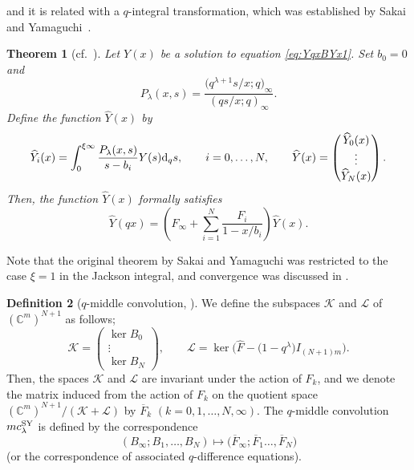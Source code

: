 \documentclass[pdftex]{sigma}
\numberwithin{equation}{section}
\newtheorem{Theorem}{Theorem}[section]
\theoremstyle{definition}
\newtheorem{Definition}[Theorem]{Definition}
\begin{document}
and it is related with a $q$-integral transformation, which was established by Sakai and Yamaguchi~\cite{SY}.
\begin{Theorem}[{cf.~\cite[Theorem 2.1]{SY}}] \label{thm:qcintSY}
Let $Y(x)$ be a solution to equation \eqref{eq:YqxBYx1}.
Set $b_0 =0$ and
\begin{equation}
 P_{\lambda}(x, s) = \frac{\bigl(q^{\lambda +1} s/x;q\bigr)_{\infty }}{(q s/x;q)_{\infty }}.  \label{eq:Plaxss/x}
\end{equation}
Define the function $\widehat{Y}(x) $ by
\begin{equation}
 \widehat{Y}_{i}(x) = \int^{\xi \infty}_{0}\frac{P_{\lambda}(x, s)}{s-b_{i}}Y(s) {\rm d}_{q}s,\qquad i=0,\dots ,N, \qquad \widehat{Y}(x) = \begin{pmatrix} \widehat{Y}_{0}(x) \\ \vdots \\ \widehat{Y}_{N}(x) \end{pmatrix}.  \label{eq:qcint0}
\end{equation}
Then, the function $\widehat{Y}(x)$ formally satisfies
\[
\widehat{Y}(q x) = \left( F_{\infty} + \sum^{N}_{i = 1}\frac{F_{i}}{1 - x/b_{i}} \right) \widehat{Y}(x).
\]
\end{Theorem}
Note that the original theorem by Sakai and Yamaguchi was restricted to the case $\xi =1$ in the Jackson integral, and convergence was discussed in \cite{AT}.

\begin{Definition}[$q$-middle convolution, \cite{SY}]\label{def:qmcSY}
We define the subspaces $\mathcal{K}$ and $\mathcal{L} $ of $(\mathbb{C}^m )^{N+1}$ as follows;
\begin{equation*}
 \mathcal{K} =
 \left(
 \begin{matrix}
 \operatorname{ker}B_0 \\
 \vdots \\
 \operatorname{ker}B_N
 \end{matrix}
 \right), \qquad
 \mathcal{L} =
 \operatorname{ker}\bigl(\widehat{F} - \bigl(1 - q^{\lambda}\bigr)I_{(N+1)m}\bigr).
\end{equation*}
Then, the spaces $\mathcal{K}$ and $\mathcal{L} $ are invariant under the action of $F_k$, and we denote the matrix induced from the action of $F_k$ on the quotient space $(\mathbb{C}^m )^{N+1}/(\mathcal{K} + \mathcal{L})$ by $\overline{F}_k$ $(k=0 ,1, \dots ,N, \infty )$.
The $q$-middle convolution $mc_\lambda ^{\rm SY}$ is defined by the correspondence
\[
( B_{\infty}; B_{1} ,\dots ,B_N ) \mapsto \bigl(\overline{F}_{\infty}; \overline{F}_1 \dots ,\allowbreak\overline{F}_N \bigr)
\]
 (or the correspondence of associated $q$-difference equations).
\end{Definition}
\end{document}
